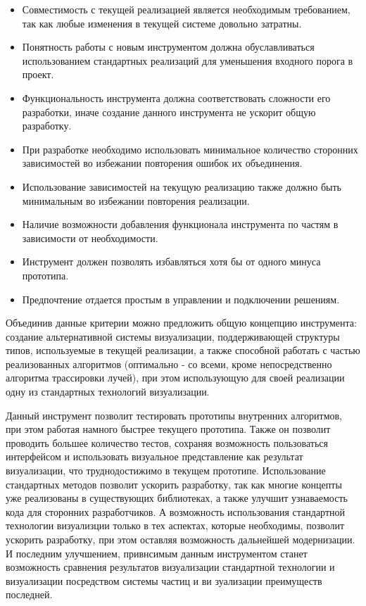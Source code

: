 \begin{itemize}
	\item Совместимость с текущей реализацией является необходимым требованием, так как любые изменения в текущей системе довольно затратны.
	\item Понятность работы с новым инструментом должна обуславливаться использованием стандартных реализаций для уменьшения входного порога в проект.
	\item Функциональность инструмента должна соответствовать сложности его разработки, иначе создание данного инструмента не ускорит общую разработку.
	\item При разработке необходимо использовать минимальное количество сторонних зависимостей во избежании повторения ошибок их объединения.
	\item Использование зависимостей на текущую реализацию также должно быть минимальным во избежании повторения реализации.
	\item Наличие возможности добавления функционала инструмента по частям в зависимости от необходимости.
	\item Инструмент должен позволять избавляться хотя бы от одного минуса прототипа. 
	\item Предпочтение отдается простым в управлении и подключении решениям.
\end {itemize}

Объединив данные критерии можно предложить общую концепцию инструмента: создание альтернативной системы визуализации, поддерживающей структуры типов, используемые в текущей реализации, а также способной работать с частью реализованных алгоритмов (оптимально - со всеми, кроме непосредственно алгоритма трассировки лучей), при этом использующую для своей реализации одну из стандартных технологий визуализации. 

Данный инструмент позволит тестировать прототипы внутренних алгоритмов, при этом работая намного быстрее текущего прототипа. Также он позволит проводить большее количество тестов, сохраняя возможность пользоваться интерфейсом и использовать визуальное представление как результат визуализации, что труднодостижимо в текущем прототипе. Использование стандартных методов позволит ускорить разработку, так как многие концепты уже реализованы в существующих библиотеках, а также улучшит узнаваемость кода для сторонних разработчиков. А возможность использования стандартной технологии визуализции только в тех аспектах, которые необходимы, позволит ускорить разработку, при этом оставляя возможность дальнейшей модернизации. И последним улучшением, привнсимым данным инструментом станет возможность сравнения результатов визуализации стандартной технологии и  визуализации посредством системы частиц и ви зуализации преимуществ последней.

